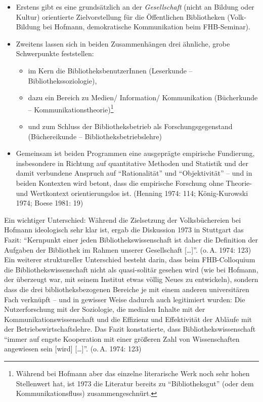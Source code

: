 \documentclass[a4paper,
fontsize=11pt,
oneside,
numbers=noperiodatend,
parskip=half-,
bibliography=totoc,
final
]{scrartcl}
\begin{document}
\begin{itemize}
\item
  Erstens gibt es eine grundsätzlich an der \emph{Gesellschaft} (nicht
  an Bildung oder Kultur) orientierte Zielvorstellung für die
  Öffentlichen Bibliotheken (Volk-Bildung bei Hofmann, demokratische
  Kommunikation beim FHB-Seminar).
\item
  Zweitens lassen sich in beiden Zusammenhängen drei ähnliche, grobe
  Schwerpunkte feststellen:

  \begin{itemize}
  \item
    im Kern die BibliotheksbenutzerInnen (Leserkunde --
    Bibliothekssoziologie),
  \item
    dazu ein Bereich zu Medien/ Information/ Kommunikation (Bücherkunde
    -- Kommunikationstheorie)\footnote{Während bei Hofmann aber das
      einzelne literarische Werk noch sehr hohen Stellenwert hat, ist
      1973 die Literatur bereits zu \enquote{Bibliotheksgut} (oder dem
      Kommunikationsfluss) zusammengeschnürt.}
  \item
    und zum Schluss der Bibliotheksbetrieb als Forschungsgegenstand
    (Büchereikunde -- Bibliotheksbetriebslehre)
  \end{itemize}
\item
  Gemeinsam ist beiden Programmen eine ausgeprägte empirische
  Fundierung, insbesondere in Richtung auf quantitative Methoden und
  Statistik und der damit verbundene Anspruch auf \enquote{Rationalität}
  und \enquote{Objektivität} -- und in beiden Kontexten wird betont,
  dass die empirische Forschung ohne Theorie- und Wertkontext
  orientierungslos ist. (Henning 1974: 114; König-Kurowski 1974; Boese
  1981: 19)
\end{itemize}

Ein wichtiger Unterschied: Während die Zielsetzung der Volksbüchereien
bei Hofmann ideologisch sehr klar ist, ergab die Diskussion 1973 in
Stuttgart das Fazit: \enquote{Kernpunkt einer jeden
Bibliothekswissenschaft ist daher die Definition der Aufgaben der
Bibliothek im Rahmen unserer Gesellschaft {[}\ldots{]}}. (o.\,A. 1974:
123) Ein weiterer struktureller Unterschied besteht darin, dass beim
FHB-Colloquium die Bibliothekswissenschaft nicht als quasi-solitär
gesehen wird (wie bei Hofmann, der überzeugt war, mit seinem Institut
etwas völlig Neues zu entwickeln), sondern dass die drei
bibliotheksbezogenen Bereiche je mit einem anderen universitären Fach
verknüpft -- und in gewisser Weise dadurch auch legitimiert wurden: Die
Nutzerforschung mit der Soziologie, die medialen Inhalte mit der
Kommunikationswissenschaft und die Effizienz und Effektivität der
Abläufe mit der Betriebswirtschaftslehre. Das Fazit konstatierte, dass
Bibliothekswissenschaft \enquote{immer auf engste Kooperation mit einer
größeren Zahl von Wissenschaften angewiesen sein {[}wird{]}
{[}\ldots{]}}. (o.\,A. 1974: 123)
\end{document}
